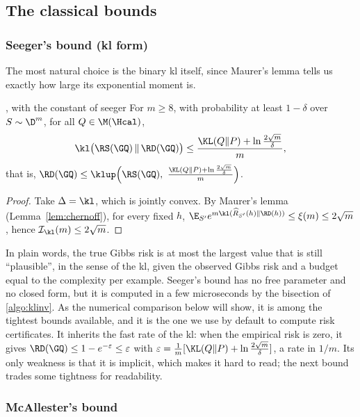 \subsection{The classical bounds}

\subsubsection{Seeger's bound (kl form)}

The most natural choice is the binary kl itself, since Maurer's lemma tells us
exactly how large its exponential moment is.

\begin{corollary}{\citet{seeger2002pac,langford2005tutorial}, with the constant of \citet{maurer2004note}}{seeger}
For $m\geq8$, with probability at least $1-\delta$ over $S\sim\D^m$, for all $Q\in\M(\Hcal)$,
\begin{equation}\label{eq:seeger}
\kl\big(\RS(\GQ)\,\|\,\RD(\GQ)\big)\leq\frac{\KL(Q\|P)+\ln\frac{2\sqrt m}{\delta}}{m},
\end{equation}
that is, $\RD(\GQ)\leq\klup\Big(\RS(\GQ),\ \frac{\KL(Q\|P)+\ln\frac{2\sqrt m}{\delta}}{m}\Big)$.
\end{corollary}
\begin{proof}
Take $\Delta=\kl$, which is jointly convex. By Maurer's lemma
(Lemma~\ref{lem:chernoff}), for every fixed $h$,
$\E_{S'}e^{m\kl(\widehat R_{S'}(h)\|\RD(h))}\leq\xi(m)\leq2\sqrt m$, hence
$\mathcal I_{\kl}(m)\leq2\sqrt m$.
\end{proof}

In plain words, the true Gibbs risk is at most the largest value that is still
``plausible'', in the sense of the kl, given the observed Gibbs risk and a
budget equal to the complexity per example. Seeger's bound has no free
parameter and no closed form, but it is computed in a few microseconds by the
bisection of \cref{algo:klinv}. As the numerical comparison below will show, it
is among the tightest bounds available, and it is the one we use by default to
compute risk certificates. It inherits the
fast rate of the kl: when the empirical risk is zero, it gives
$\RD(\GQ)\leq1-e^{-\varepsilon}\leq\varepsilon$ with
$\varepsilon=\frac1m[\KL(Q\|P)+\ln\frac{2\sqrt m}\delta]$, a rate in $1/m$.
Its only weakness is that it is implicit, which makes it hard to read; the next
bound trades some tightness for readability.

\subsubsection{McAllester's bound}

